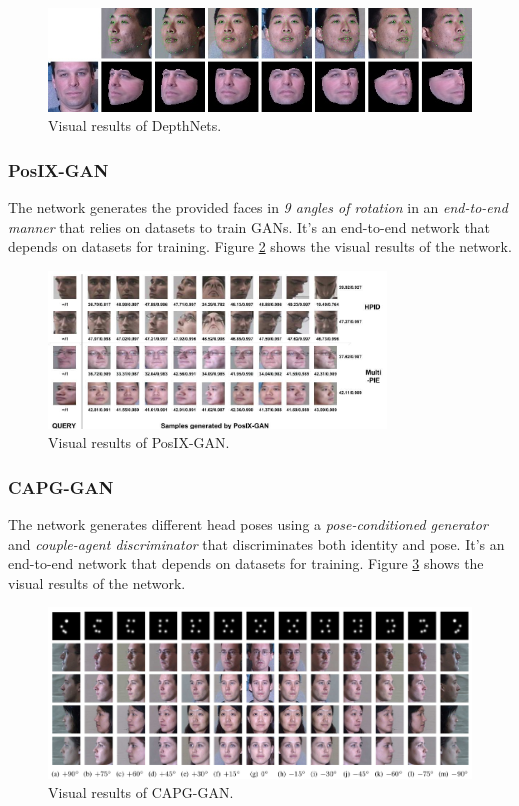 \begin{figure}[H]
    \centering
    \includegraphics[width=\textwidth]{images/depthnets.png}
    \caption{Visual results of DepthNets.}
    \label{fig:dn}
\end{figure}

\subsubsection{PosIX-GAN}

The network \cite{inbook} generates the provided faces in \emph{9 angles of rotation} in an \emph{end-to-end manner} that relies on datasets to train GANs. It's an end-to-end network that depends on datasets for training. Figure \ref{fig:posix} shows the visual results of the network.

\begin{figure}[H]
    \centering
    \includegraphics[width=0.8\textwidth]{images/posix-gan.png}
    \caption{Visual results of PosIX-GAN.}
    \label{fig:posix}
\end{figure}

\subsubsection{CAPG-GAN}
The network \cite{8578974} generates different head poses using a \emph{pose-conditioned generator} and \emph{couple-agent discriminator} that discriminates both identity and pose. It's an end-to-end network that depends on datasets for training. Figure \ref{fig:capg} shows the visual results of the network.

\begin{figure}[H]
    \centering
    \includegraphics[width=\textwidth]{images/capg-gan.png}
    \caption{Visual results of CAPG-GAN.}
    \label{fig:capg}
\end{figure}

